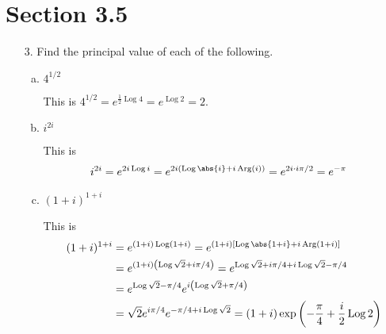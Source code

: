 \documentclass{article}
\DeclareMathOperator{\Log}{Log}
\DeclareMathOperator{\Arg}{Arg}
\begin{document}
\section*{Section 3.5}

\begin{itemize}
	\item[3.] Find the principal value of each of the following.
		\begin{enumerate}[(a)]
			\item $4^{1/2}$
				\begin{soln}
					This is $4^{1/2} = e^{\frac{1}{2}\Log 4}=e^{\Log 2} = 2.$
				\end{soln}

			\item $i^{2i}$
				\begin{soln}
					This is
					\begin{align*}
						i^{2i} &= e^{2i\Log i} = e^{2i\left( \Log \abs{i} + i\Arg(i) \right)} = e^{2i\cdot i\pi/2} = e^{-\pi}
					\end{align*}
				\end{soln}

			\item $(1+i)^{1+i}$
				\begin{soln}
					This is 
					\begin{align*}
						(1+i)^{1+i} &= e^{(1+i)\Log(1+i)} = e^{(1+i)\left[ \Log\abs{1+i} + i\Arg(1+i) \right]} \\
						&= e^{(1+i)\left( \Log \sqrt{2} + i \pi/4\right)} = e^{\Log \sqrt{2} + i\pi/4 + i\Log\sqrt{2} - \pi/4} \\
						&= e^{\Log \sqrt{2} - \pi/4} e^{i\left( \Log \sqrt{2} + \pi/4 \right)} \\
						&= \sqrt{2}e^{i\pi/4} e^{-\pi/4 + i\Log \sqrt{2}} = (1+i)\exp\left( -\frac{\pi}{4} + \frac{i}{2}\Log 2 \right)
					\end{align*}
				\end{soln}

		\end{enumerate}


\end{itemize}
\end{document}
